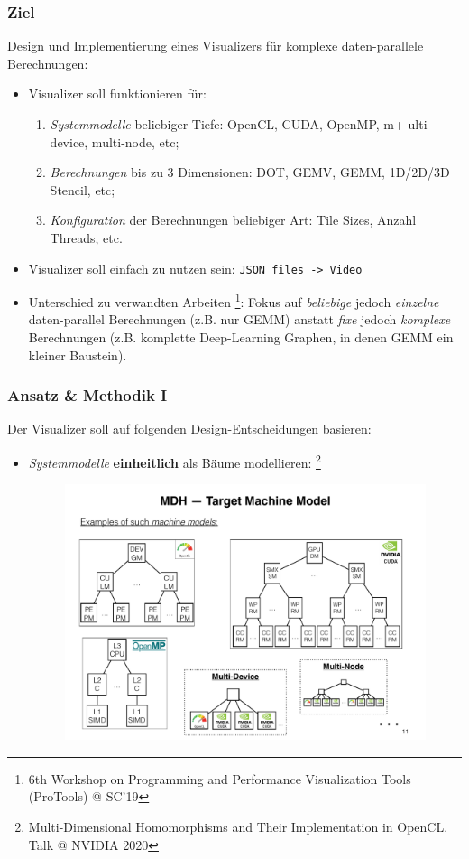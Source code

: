 \documentclass{presentation}
\begin{document}
\begin{frame}
	\frametitle{Ziel}
	Design und Implementierung eines Visualizers für komplexe daten-parallele Berechnungen:
	
	\begin{itemize}
		\item Visualizer soll funktionieren für:
		\begin{enumerate}
			\item \emph{Systemmodelle} beliebiger Tiefe: OpenCL, CUDA, OpenMP, m+-ulti-device, multi-node, etc;
			\item \emph{Berechnungen} bis zu 3 Dimensionen: DOT, GEMV, GEMM, 1D/2D/3D Stencil, etc;
			\item \emph{Konfiguration} der Berechnungen beliebiger Art: Tile Sizes, Anzahl Threads, etc.
		\end{enumerate}
		\item Visualizer soll einfach zu nutzen sein: \texttt{JSON files -> Video}
		\item Unterschied zu verwandten Arbeiten \footnote{6th Workshop on Programming and Performance Visualization Tools (ProTools) @ SC'19}: Fokus auf \emph{beliebige} jedoch \emph{einzelne} daten-parallel Berechnungen (z.B. nur GEMM) anstatt \emph{fixe} jedoch \emph{komplexe} Berechnungen (z.B. komplette Deep-Learning Graphen, in denen GEMM ein kleiner Baustein).
	\end{itemize}
\end{frame}

\begin{frame}
	\frametitle{Ansatz \& Methodik I}
	Der Visualizer soll auf folgenden Design-Entscheidungen basieren:
	
	\begin{itemize}
		\item \emph{Systemmodelle} \textbf{einheitlich} als Bäume modellieren:
		\footnote{Multi-Dimensional Homomorphisms and Their Implementation in OpenCL. Talk @ NVIDIA 2020}
		\begin{figure}
			\includegraphics[width=0.6\linewidth]{images/system_models.pdf}
		\end{figure}
	\end{itemize}

\end{frame}
\end{document}
